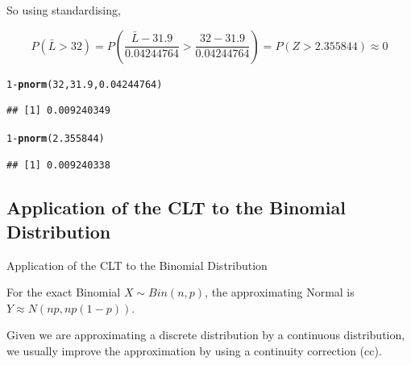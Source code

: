 \documentclass[t,xcolor=pdftex,dvipsnames,table]{beamer}
\makeatletter
\newcommand{\hlnum}[1]{\textcolor[rgb]{0.686,0.059,0.569}{#1}}%
\newcommand{\hlopt}[1]{\textcolor[rgb]{0,0,0}{#1}}%
\newcommand{\hlstd}[1]{\textcolor[rgb]{0.345,0.345,0.345}{#1}}%
\newcommand{\hlkwd}[1]{\textcolor[rgb]{0.737,0.353,0.396}{\textbf{#1}}}%
\newenvironment{kframe}{%
 \def\at@end@of@kframe{}%
 \ifinner\ifhmode%
  \def\at@end@of@kframe{\end{minipage}}%
  \begin{minipage}{\columnwidth}%
 \fi\fi%
 \def\FrameCommand##1{\hskip\@totalleftmargin \hskip-\fboxsep
 \colorbox{shadecolor}{##1}\hskip-\fboxsep
     \hskip-\linewidth \hskip-\@totalleftmargin \hskip\columnwidth}%
 \MakeFramed {\advance\hsize-\width
   \@totalleftmargin\z@ \linewidth\hsize
   \@setminipage}}%
 {\par\unskip\endMakeFramed%
 \at@end@of@kframe}
\newenvironment{knitrout}{}{} %
\makeatother
\begin{document}
\begin{frame}[fragile]{}
So using standardising,

\[ P(\bar{L} > 32) = P(\frac{\bar{L}-31.9}{0.04244764} > \frac{32-31.9}{0.04244764}) = P(Z > 2.355844) \approx 0 \]

\begin{knitrout}
\color{fgcolor}\begin{kframe}
\begin{alltt}
\hlnum{1}\hlopt{-}\hlkwd{pnorm}\hlstd{(}\hlnum{32}\hlstd{,}\hlnum{31.9}\hlstd{,}\hlnum{0.04244764}\hlstd{)}
\end{alltt}
\begin{verbatim}
## [1] 0.009240349
\end{verbatim}
\begin{alltt}
\hlnum{1}\hlopt{-}\hlkwd{pnorm}\hlstd{(}\hlnum{2.355844}\hlstd{)}
\end{alltt}
\begin{verbatim}
## [1] 0.009240338
\end{verbatim}
\end{kframe}
\end{knitrout}
\end{frame}



\subsection[CLTBinomial]{Application of the CLT to the Binomial Distribution}

\begin{frame}{Application of the CLT to the Binomial Distribution}

\begin{definition}

For the exact Binomial $X \sim  Bin(n,p)$, the approximating Normal is
$ Y \approx N (np, np(1-p))$.

\vspace{.5cm}
Given we are approximating a discrete distribution by a continuous distribution, we usually improve the approximation by using a continuity correction (cc).
\end{definition}

\end{frame}
\end{document}
